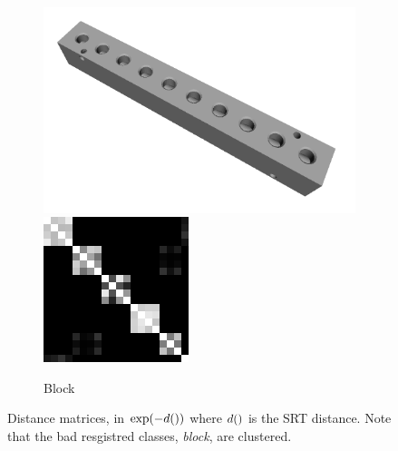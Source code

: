 \begin{figure}[ht]
\begin{subfigure}[b]{0.23\linewidth}
		\includegraphics[width=\linewidth]{fig/reg/block.png} \\
		\includegraphics[width=\linewidth]{fig/reg/reg3Dtrain_block.png} 
		\caption{Block}
	\end{subfigure}
	\caption{Distance matrices, in $\exp(-d())$ where $d()$ is the SRT distance. Note that the bad resgistred classes, \eg \emph{block}, are clustered.}
	\label{fig/reg/reg_srtmatrices}
\end{figure}

